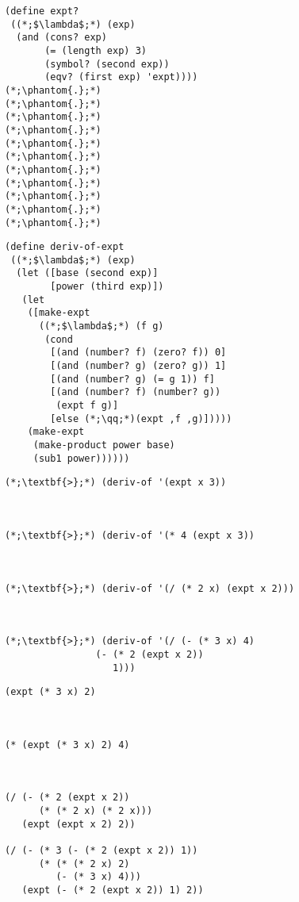 \begin{clrr}[]{}
\begin{lstlisting}[language=MyScheme]
(define expt?
 ((*;$\lambda$;*) (exp)
  (and (cons? exp)
       (= (length exp) 3)
       (symbol? (second exp))
       (eqv? (first exp) 'expt))))
(*;\phantom{.};*)
(*;\phantom{.};*)
(*;\phantom{.};*)
(*;\phantom{.};*)
(*;\phantom{.};*)
(*;\phantom{.};*)
(*;\phantom{.};*)
(*;\phantom{.};*)
(*;\phantom{.};*)
(*;\phantom{.};*)
(*;\phantom{.};*)
\end{lstlisting}
\tcblower
\begin{lstlisting}[language=MyNLNScheme]
(define deriv-of-expt
 ((*;$\lambda$;*) (exp)
  (let ([base (second exp)]
        [power (third exp)])
   (let 
    ([make-expt
      ((*;$\lambda$;*) (f g)
       (cond
        [(and (number? f) (zero? f)) 0]
        [(and (number? g) (zero? g)) 1]
        [(and (number? g) (= g 1)) f]
        [(and (number? f) (number? g)) 
         (expt f g)]
        [else (*;\qq;*)(expt ,f ,g)]))))
    (make-expt 
     (make-product power base)
     (sub1 power))))))
\end{lstlisting}
\end{clrr}

\begin{cloast}[]{}\begin{lstlisting}[language=MyNLNScheme]
(*;\textbf{>};*) (deriv-of '(expt x 3))



(*;\textbf{>};*) (deriv-of '(* 4 (expt x 3))



(*;\textbf{>};*) (deriv-of '(/ (* 2 x) (expt x 2)))



(*;\textbf{>};*) (deriv-of '(/ (- (* 3 x) 4) 
                (- (* 2 (expt x 2)) 
                   1)))
\end{lstlisting}
\tcblower
\begin{lstlisting}[language=MySOutput]
(expt (* 3 x) 2)



(* (expt (* 3 x) 2) 4)



(/ (- (* 2 (expt x 2)) 
      (* (* 2 x) (* 2 x))) 
   (expt (expt x 2) 2))
   
(/ (- (* 3 (- (* 2 (expt x 2)) 1)) 
      (* (* (* 2 x) 2) 
         (- (* 3 x) 4))) 
   (expt (- (* 2 (expt x 2)) 1) 2))
\end{lstlisting}
\end{cloast}

